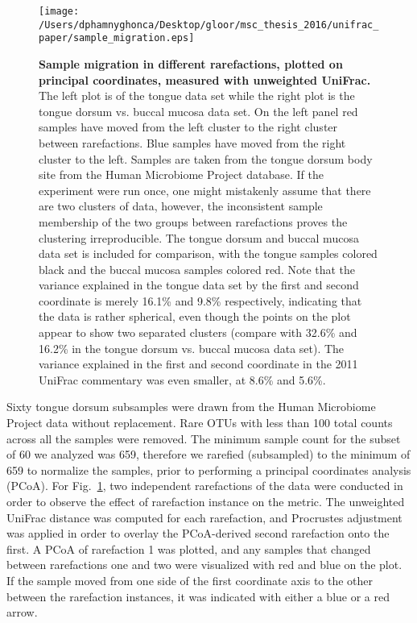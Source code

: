 \documentclass[10pt,letterpaper]{article}
\begin{document}
\begin{figure}[h]
\texttt{[image: /Users/dphamnyghonca/Desktop/gloor/msc\_thesis\_2016/unifrac\_paper/sample\_migration.eps]}
\caption[Sample migration in different rarefactions, plotted on principal coordinates, measured with unweighted UniFrac.]{{\bf Sample migration in different rarefactions, plotted on principal coordinates, measured with unweighted UniFrac.}
The left plot is of the tongue data set while the right plot is the tongue dorsum vs. buccal mucosa data set. On the left panel red samples have moved from the left cluster to the right cluster between rarefactions. Blue samples have moved from the right cluster to the left. Samples are taken from the tongue dorsum body site from the Human Microbiome Project database. If the experiment were run once, one might mistakenly assume that there are two clusters of data, however, the inconsistent sample membership of the two groups between rarefactions proves the clustering irreproducible. The tongue dorsum and buccal mucosa data set is included for comparison, with the tongue samples colored black and the buccal mucosa samples colored red. Note that the variance explained in the tongue data set by the first and second coordinate is merely 16.1\% and 9.8\% respectively, indicating that the data is rather spherical, even though the points on the plot appear to show two separated clusters (compare with 32.6\% and 16.2\% in the tongue dorsum vs. buccal mucosa data set). The variance explained in the first and second coordinate in the 2011 UniFrac commentary \cite{lozupone2011unifrac} was even smaller, at 8.6\% and 5.6\%.}
\label{fig2}
\end{figure}

Sixty tongue dorsum subsamples were drawn from the Human Microbiome Project data without replacement. Rare OTUs with less than 100 total counts across all the samples were removed. The minimum sample count for the subset of 60 we analyzed was 659, therefore we rarefied (subsampled) to the minimum of 659 to normalize the samples, prior to performing a principal coordinates analysis (PCoA). For Fig.~\ref{fig2}, two independent rarefactions of the data were conducted in order to observe the effect of rarefaction instance on the metric. The unweighted UniFrac distance was computed for each rarefaction, and Procrustes adjustment was applied in order to overlay the PCoA-derived second rarefaction onto the first. A PCoA of rarefaction 1 was plotted, and any samples that changed between rarefactions one and two were visualized with red and blue on the plot. If the sample moved from one side of the first coordinate axis to the other between the rarefaction instances, it was indicated with either a blue or a red arrow. 
\end{document}
